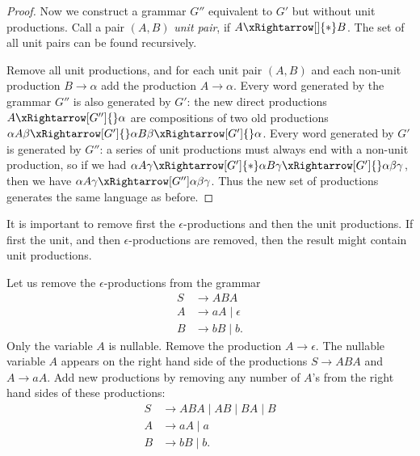 \begin{page}
\begin{proof}
Now we construct a grammar $G''$ equivalent to $G'$ but without unit productions.
Call a pair $(A, B)$ \emph{unit pair}, if $A \xRightarrow[]{*} B$.
The set of all unit pairs can be found recursively.

Remove all unit productions, and for each unit pair $(A, B)$ and each non-unit production $B \to \alpha$ add the production $A \to \alpha$.
Every word generated by the grammar $G''$ is also generated by $G'$:
the new direct productions $A \xRightarrow[G'']{} \alpha$ are compositions of two old productions
$\alpha A \beta \xRightarrow[G']{} \alpha B \beta \xRightarrow[G']{} \alpha$.
Every word generated by $G'$ is generated by $G''$: a series of unit productions must always end with a non-unit production,
so if we had $\alpha A \gamma \xRightarrow[G']{*} \alpha B \gamma \xRightarrow[G']{} \alpha\beta\gamma$,
then we have $\alpha A \gamma \xRightarrow[G''] \alpha\beta\gamma$.
Thus the new set of productions generates the same language as before.
\end{proof}
It is important to remove first the $\epsilon$-productions and then the unit productions.
If first the unit, and then $\epsilon$-productions are removed, then the result might contain unit productions.


\end{page}

\begin{page}
\setcounter{section}{5}
\setcounter{subsection}{2}
\setcounter{dfn}{9}
\label{portion:1100}

\begin{exl}
Let us remove the $\epsilon$-productions from the grammar
\begin{align*}
S &\to ABA\\
A &\to aA \mid \epsilon\\
B &\to bB \mid b.
\end{align*}
Only the variable $A$ is nullable.
Remove the production $A \to \epsilon$.
The nullable variable $A$ appears on the right hand side of the productions $S \to ABA$ and $A \to aA$.
Add new productions by removing any number of $A$'s from the right hand sides of these productions:
\begin{align*}
S &\to ABA \mid AB \mid BA \mid B\\
A &\to aA \mid a\\
B &\to bB \mid b.
\end{align*}
\end{exl}

\end{page}

